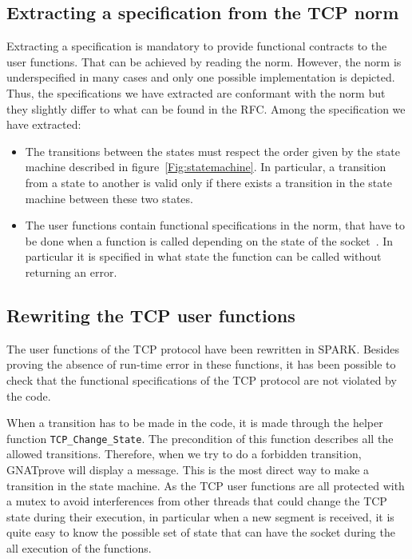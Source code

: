 \documentclass[conference]{IEEEtran}
\def\spark#1{\lstinline[language=Ada]{#1}}
\begin{document}


\subsection{Extracting a specification from the TCP norm}

Extracting a specification
is mandatory to provide functional contracts to the user functions. That can
be achieved by reading the norm. However, the norm is underspecified in many
cases and only one possible implementation is depicted. Thus, the specifications
we have extracted are conformant with the norm but they slightly differ to what
can be found in the RFC.
Among the specification we have extracted:
\begin{itemize}
\item The transitions between the states must respect the order given by the
state machine described in figure~\ref{Fig:statemachine}.
In particular, a transition from a state to
another is valid only if there exists a transition in the state machine between
these two states.
\item The user functions contain functional specifications in the norm, that
have to be done  when a function is called depending on the state of the
socket~\cite[p. 52]{rfc793}. In particular it is specified in what state the
function can be called without returning an error.
\end{itemize}

\subsection{Rewriting the TCP user functions}

The user functions of the TCP protocol have been rewritten in SPARK. Besides
proving the absence of run-time error in these functions, it has been possible
to check that the functional specifications of the TCP protocol are not violated
by the code.



When a transition has to be made in the code, it is made through the helper
function \spark{TCP_Change_State}. The precondition of this function describes
all the allowed transitions. Therefore, when we try to do a forbidden transition,
GNATprove will display a message. This is the most direct way to make a
transition in the state machine.
As the TCP user functions are all protected with a mutex to avoid interferences
from other threads that could change the TCP state during their execution, in
particular when a new segment is received, it is quite easy to know the
possible set of state that can have the socket during the all execution of the
functions.
\end{document}
